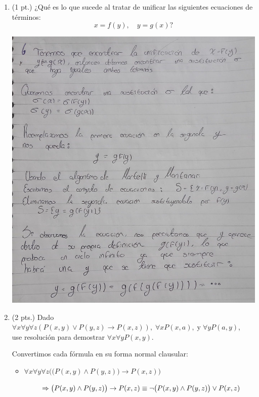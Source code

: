 \documentclass[12pt,letterpaper]{article}
\newcommand{\imp}{\rightarrow}
\begin{document}
\begin{enumerate}
\item (1 pt.) ¿Qué es lo que sucede al tratar de unificar las siguientes ecuaciones de términos:  
  \[
  x = f(y), \quad y = g(x)?
  \]
  \begin{center}
    \hspace{-1.2cm} \includegraphics[width=\textwidth,height=0.9\textheight,keepaspectratio]{ejercicio6.png}
  \end{center}

  \newpage
  
\item (2 pts.) Dado \(\forall x \forall y \forall z (P(x,y) \lor P(y,z) \imp P(x,z)), \; \forall x P(x,a), \; \text{y} \; \forall y P(a,y)\),\\
  use resolución para demostrar \( \forall x \forall y P(x,y) \).
  \bigskip

  Convertimos cada f\'{o}rmula en su forma normal clausular:

  \begin{itemize}
  \item \( \forall x \forall y \forall z \Big(\big(P(x, y) \land P(y, z)\big) \imp P(x, z) \Big) \)
    
    \( \hspace{0.8cm} \Rightarrow \big(P(x, y) \land P(y, z)\big) \imp P(x, z) \equiv \neg \big(P(x, y) \land P(y, z)\big) \lor P(x, z) \)


\end{itemize}
\end{enumerate}
\end{document}
